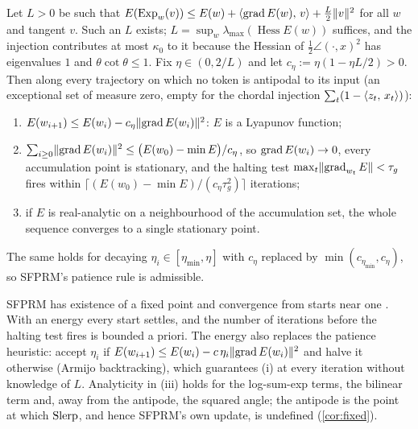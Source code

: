 \begin{theorem}
\label{thm:lyapunov}
Let $L>0$ be such that $E(\operatorname{Exp}_w(v))\le E(w)+\langle \operatorname{grad} E(w),\, v\rangle+\tfrac L2\lVert v\rVert^2$ for all $w$ and
tangent $v$. Such an $L$ exists; $L=\sup_w\lambda_{\max}(\operatorname{Hess}E(w))$ suffices, and the
injection contributes at most $\kappa_0$ to it because the Hessian of $\tfrac12\angle(\cdot,x)^2$ has
eigenvalues $1$ and $\theta\cot\theta\le1$. Fix $\eta\in(0,2/L)$ and let $c_\eta:=\eta(1-\eta L/2)>0$.
Then along every trajectory on which no token is antipodal to its input (an exceptional set of
measure zero, empty for the chordal injection $\sum_t(1-\langle z_t,\, x_t\rangle)$):
\begin{enumerate}
  \item[(i)] $E(w_{i+1})\le E(w_i)-c_\eta\lVert \operatorname{grad} E(w_i)\rVert^2$: $E$ is a Lyapunov function;
  \item[(ii)] $\sum_{i\ge0}\lVert \operatorname{grad} E(w_i)\rVert^2\le\big(E(w_0)-\min E\big)/c_\eta$, so
        $\operatorname{grad} E(w_i)\to0$, every accumulation point is stationary, and the halting test
        $\max_t\lVert \operatorname{grad}_{w_t}E\rVert<\tau_g$ fires within
        $\big\lceil(E(w_0)-\min E)/(c_\eta\tau_g^2)\big\rceil$ iterations;
  \item[(iii)] if $E$ is real-analytic on a neighbourhood of the accumulation set, the whole
        sequence converges to a single stationary point.
\end{enumerate}
The same holds for decaying $\eta_i\in[\eta_{\min},\eta]$ with $c_\eta$ replaced by
$\min(c_{\eta_{\min}},c_\eta)$, so SFPRM's patience rule is admissible.
\end{theorem}

SFPRM has existence of a fixed point and convergence from starts near one \citep{sfprm}. With an
energy every start settles, and the number of iterations before the halting test fires is bounded
a priori. The energy also replaces the patience heuristic: accept $\eta_i$ if
$E(w_{i+1})\le E(w_i)-c\,\eta_i\lVert \operatorname{grad} E(w_i)\rVert^2$ and halve it otherwise (Armijo backtracking),
which guarantees (i) at every iteration without knowledge of $L$. Analyticity in (iii) holds for the
log-sum-exp terms, the bilinear term and, away from the antipode, the squared angle; the antipode is
the point at which $\operatorname{Slerp}$, and hence SFPRM's own update, is undefined (\cref{cor:fixed}).


